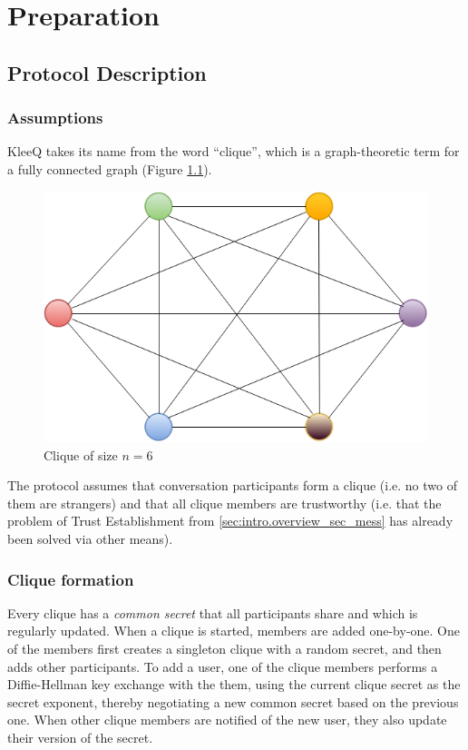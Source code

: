 \documentclass[a4paper, 12pt]{report}
\begin{document}
\chapter{Preparation}
\label{ch:prep}

\section{Protocol Description}
\label{sec:prep.proto}

\subsection{Assumptions}
KleeQ takes its name from the word ``clique'', which is a graph-theoretic term for a fully connected graph (Figure \ref{fig:clique}).
\begin{figure}[h]
    \centering
    \includegraphics[scale = 0.5]{pics/clique.png}
    \caption{Clique of size $n = 6$ \label{fig:clique}}
\end{figure}
The protocol assumes that conversation participants form a clique (i.e. no two of them are strangers) and that all clique members are trustworthy (i.e. that the problem of Trust Establishment from \cref{sec:intro.overview_sec_mess} has already been solved via other means). 


\subsection{Clique formation}
\label{subsec:formation}
Every clique has a \emph{common secret} that all participants share and which is regularly updated. When a clique is started, members are added one-by-one. One of the members first creates a singleton clique with a random secret, and then adds other participants. To add a user, one of the clique members performs a Diffie-Hellman key exchange \cite{diffie1976new} with the them, using the current clique secret as the secret exponent, thereby negotiating a new common secret based on the previous one. When other clique members are notified of the new user, they also update their version of the secret. 
\end{document}
